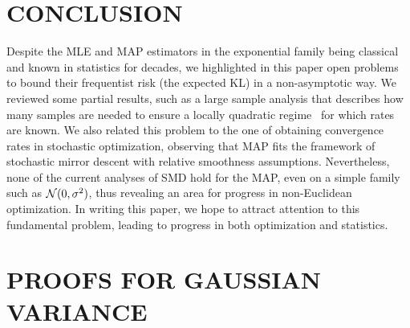 \section{CONCLUSION}
Despite the MLE and MAP estimators in the exponential family being classical and known in statistics for decades, we highlighted in this paper open problems to bound their frequentist risk (the expected KL) in a non-asymptotic way. We reviewed some partial results, such as a large sample analysis that describes how many samples are needed to ensure a locally quadratic regime~\citep{kakade2010learning, ostrovskii2021finite} for which rates are known. We also related this problem to the one of obtaining convergence rates in stochastic optimization, observing that MAP fits the framework of stochastic mirror descent with relative smoothness assumptions.
Nevertheless, none of the current analyses of SMD hold for the MAP, even on a simple family such as ${\mathcal N}(0,\sigma^2)$, thus revealing an area for progress in non-Euclidean optimization.
In writing this paper, we hope to attract attention to this fundamental problem, leading to progress in both optimization and statistics.



\clearpage



\clearpage
\appendix



\renewcommand{\contentsname}{APPENDICES}
\tableofcontents


\section{PROOFS FOR GAUSSIAN VARIANCE}
\label{app:gaussian-variance}


